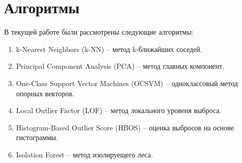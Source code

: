 
\clearpage

\section{Алгоритмы} \label{sec:ch2/sec4}

\noindent В текущей работе были рассмотрены следующие алгоритмы:

\begin{enumerate}
	\item k-Nearest Neighbors (k-NN) \cite{knn} -- метод k-ближайших соседей.
	\item Principal Component Analysis (PCA) \cite{pca} -- метод главных компонент.
	\item One-Class Support Vector Machines (OCSVM) \cite{ocsvm} -- одноклассовый метод опорных векторов.
	\item Local Outlier Factor (LOF) \cite{lof} -- метод локального уровеня выброса.
	\item Histogram-Based Outlier Score (HBOS) \cite{hbos} -- оценка выбросов на основе гистограммы.
	\item Isolation Forest \cite{iforest} -- метод изолируещего леса.
\end{enumerate}

%
%
%
%
%
%
%
%
%
%
%
%
%
%
%




